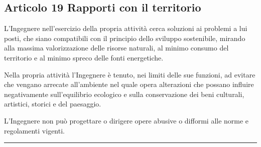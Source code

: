 \documentclass[letterpaper,10pt,italian]{sphinxmanual}
\begin{document}
\subsection{Articolo 19 \sphinxhyphen{} Rapporti con il territorio}
\label{\detokenize{capitoli/codice/codice_deontologico:articolo-19-rapporti-con-il-territorio}}\begin{description}
\sphinxAtStartPar
L’Ingegnere nell’esercizio della propria attività cerca soluzioni ai problemi a lui posti, che siano compatibili con il principio dello sviluppo sostenibile, mirando alla massima valorizzazione delle risorse naturali, al minimo consumo del territorio e al minimo spreco delle fonti energetiche.

\sphinxAtStartPar
Nella propria attività l’Ingegnere è tenuto, nei limiti delle sue funzioni, ad evitare che vengano arrecate all’ambiente nel quale opera alterazioni che possano influire negativamente sull’equilibrio ecologico e sulla conservazione dei beni culturali, artistici, storici e del paesaggio.

\sphinxAtStartPar
L’Ingegnere non può progettare o dirigere opere abusive o difformi alle norme e regolamenti vigenti.

\end{description}


\bigskip\hrule\bigskip



\section{}
\label{\detokenize{capitoli/codice/codice_deontologico:capo-v-rapporti-con-l-ordine}}
\end{document}
